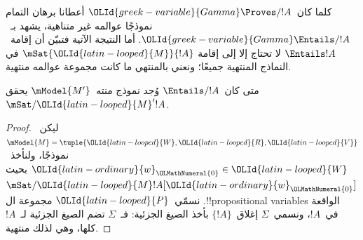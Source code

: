 \documentclass[../../../include/open-logic-section]{subfiles}
\begin{document}


كلما كان~$\OLId{greek-variable}{Gamma} \Proves/ !A$ أعطانا برهان التمام نموذجًا عوالمه غير
متناهية، يشهد بـ~$\OLId{greek-variable}{Gamma} \Entails/ !A$. أما النتيجة الآتية فتبيّن أن
إقامة~$\Entails !A$ لا تحتاج إلا إلى إقامة
$\mSat{\OLId{latin-looped}{M}}{!A}$ في النماذج المنتهية جميعًا؛ ونعني بالمنتهي ما كانت
مجموعة عوالمه منتهية.

\begin{thm}
  متى كان~$\Entails/ !A$ وُجد نموذج منته~$\mModel{M'}$ يحقق
  $\mSat/{\OLId{latin-looped}{M}'}{!A}$.
\end{thm}

\begin{proof}
  ليكن~$\mModel{M}=\tuple{\OLId{latin-looped}{W},\OLId{latin-looped}{R},\OLId{latin-looped}{V}}$ نموذجًا، ولنأخذ~$\OLId{latin-ordinary}{w}_\OLMathNumeral{0}\in \OLId{latin-looped}{W}$ بحيث
  $\mSat/{\OLId{latin-looped}{M}}{!A}[\OLId{latin-ordinary}{w}_\OLMathNumeral{0}]$. نسمّي~$\OLId{latin-looped}{P}$ مجموعة ال!!{propositional variable}s
  الواقعة في~$!A$، ونسمي~$\Sigma$ إغلاق~$\{!A\}$ بأخذ
  الصيغ الجزئية: فـ~$\Sigma$ تضم الصيغ الجزئية
  لـ~$!A$ كلها، وهي لذلك منتهية.


\end{proof}
\end{document}
